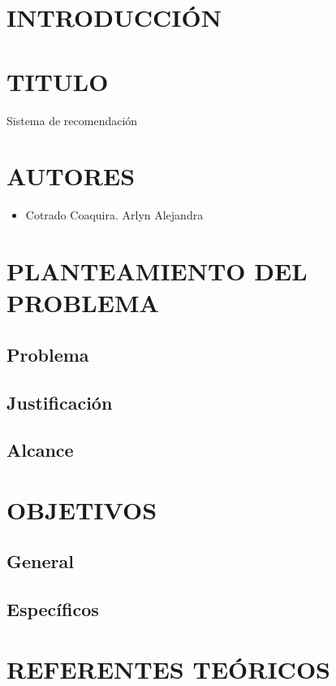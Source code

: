 \documentclass[12pt,letterpaper]{article}
\begin{document}
\section{INTRODUCCIÓN} 



\newpage
\section{TITULO}
	\par Sistema de recomendación 
\section{AUTORES}

\begin{itemize}
	\item Cotrado Coaquira. Arlyn Alejandra
	
\end{itemize}

\section{PLANTEAMIENTO DEL PROBLEMA}
	\subsection{Problema}
	\subsection{Justificación}
	\subsection{Alcance}

\section{OBJETIVOS}
	\subsection{General}
	\subsection{Específicos}

\section{REFERENTES TEÓRICOS}
\end{document}
